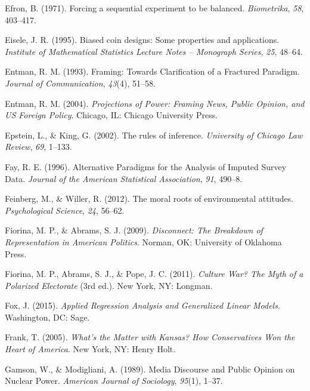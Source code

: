 \documentclass[12pt,econ]{sources/authesis}
\begin{document}
\leavevmode\hypertarget{ref-efron_1971_forcing}{}%
Efron, B. (1971). Forcing a sequential experiment to be balanced. \emph{Biometrika}, \emph{58}, 403--417.

\leavevmode\hypertarget{ref-eisele_1995_biased}{}%
Eisele, J. R. (1995). Biased coin designs: Some properties and applications. \emph{Institute of Mathematical Statistics Lecture Notes -- Monograph Series}, \emph{25}, 48--64.

\leavevmode\hypertarget{ref-entman_framing_1993}{}%
Entman, R. M. (1993). Framing: Towards Clarification of a Fractured Paradigm. \emph{Journal of Communication}, \emph{43}(4), 51--58.

\leavevmode\hypertarget{ref-entman_projections_2004}{}%
Entman, R. M. (2004). \emph{Projections of Power: Framing News, Public Opinion, and US Foreign Policy}. Chicago, IL: Chicago University Press.

\leavevmode\hypertarget{ref-epstein_2002_rules}{}%
Epstein, L., \& King, G. (2002). The rules of inference. \emph{University of Chicago Law Review}, \emph{69}, 1--133.

\leavevmode\hypertarget{ref-fay_1996_alternative}{}%
Fay, R. E. (1996). Alternative Paradigms for the Analysis of Imputed Survey Data. \emph{Journal of the American Statistical Association}, \emph{91}, 490--8.

\leavevmode\hypertarget{ref-feinberg_2012_moral}{}%
Feinberg, M., \& Willer, R. (2012). The moral roots of environmental attitudes. \emph{Psychological Science}, \emph{24}, 56--62.

\leavevmode\hypertarget{ref-fiorina_disconnect_2009}{}%
Fiorina, M. P., \& Abrams, S. J. (2009). \emph{Disconnect: The Breakdown of Representation in American Politics}. Norman, OK: University of Oklahoma Press.

\leavevmode\hypertarget{ref-fiorina_culture_2011}{}%
Fiorina, M. P., Abrams, S. J., \& Pope, J. C. (2011). \emph{Culture War? The Myth of a Polarized Electorate} (3rd ed.). New York, NY: Longman.

\leavevmode\hypertarget{ref-fox_applied_2015}{}%
Fox, J. (2015). \emph{Applied Regression Analysis and Generalized Linear Models}. Washington, DC: Sage.

\leavevmode\hypertarget{ref-frank_whats_2005}{}%
Frank, T. (2005). \emph{What's the Matter with Kansas? How Conservatives Won the Heart of America}. New York, NY: Henry Holt.

\leavevmode\hypertarget{ref-gamson_media_1989}{}%
Gamson, W., \& Modigliani, A. (1989). Media Discourse and Public Opinion on Nuclear Power. \emph{American Journal of Sociology}, \emph{95}(1), 1--37.
\end{document}
